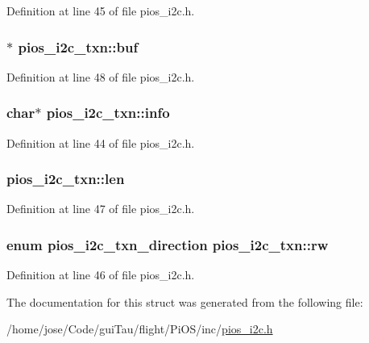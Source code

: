 Definition at line 45 of file pios\-\_\-i2c.\-h.

\hypertarget{structpios__i2c__txn_a0d544e19d0f73acb6bf43743bc5e1480}{
\subsubsection[{buf}]{$\ast$ pios\-\_\-i2c\-\_\-txn\-::buf}}\label{structpios__i2c__txn_a0d544e19d0f73acb6bf43743bc5e1480}


Definition at line 48 of file pios\-\_\-i2c.\-h.

\hypertarget{structpios__i2c__txn_a202db3e74679d070f4f3d27c1dcb0f39}{
\subsubsection[{info}]{ char$\ast$ pios\-\_\-i2c\-\_\-txn\-::info}}\label{structpios__i2c__txn_a202db3e74679d070f4f3d27c1dcb0f39}


Definition at line 44 of file pios\-\_\-i2c.\-h.

\hypertarget{structpios__i2c__txn_af238133c1e4df913933e48fc29c5510b}{
\subsubsection[{len}]{ pios\-\_\-i2c\-\_\-txn\-::len}}\label{structpios__i2c__txn_af238133c1e4df913933e48fc29c5510b}


Definition at line 47 of file pios\-\_\-i2c.\-h.

\hypertarget{structpios__i2c__txn_a604f5e93b6ae3da9573915bc03bb1821}{
\subsubsection[{rw}]{\setlength{\rightskip}{0pt plus 5cm}enum {\bf pios\-\_\-i2c\-\_\-txn\-\_\-direction} pios\-\_\-i2c\-\_\-txn\-::rw}}\label{structpios__i2c__txn_a604f5e93b6ae3da9573915bc03bb1821}


Definition at line 46 of file pios\-\_\-i2c.\-h.



The documentation for this struct was generated from the following file\-:\begin{DoxyCompactItemize}
\item 
/home/jose/\-Code/gui\-Tau/flight/\-Pi\-O\-S/inc/\hyperlink{_pi_o_s_2inc_2pios__i2c_8h}{pios\-\_\-i2c.\-h}\end{DoxyCompactItemize}
